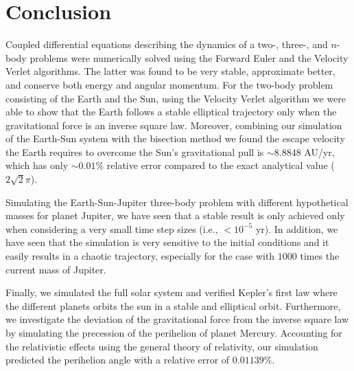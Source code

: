 \documentclass[a4paper]{article}
\begin{document}
\section{Conclusion}
Coupled differential equations describing the dynamics of a two-, three-, and $n$-body problems were numerically solved using the Forward Euler and the Velocity Verlet algorithms.
The latter was found to be very stable, approximate better, and conserve both energy and angular momentum. For the two-body problem consisting of the Earth and the Sun, using the Velocity Verlet algorithm we were able to show that the Earth follows a stable elliptical trajectory only when the gravitational force is an inverse square law. Moreover, combining our simulation of the Earth-Sun system with the bisection method we found the escape velocity the Earth requires to overcome the Sun's gravitational pull is $\sim 8.8848$ AU/yr, which has only $\sim 0.01\%$ relative error compared to the exact analytical value ($2\sqrt{2}\pi$).

Simulating the Earth-Sun-Jupiter three-body problem with different hypothetical masses for planet Jupiter, we have seen that a stable result is only achieved only when considering a very small time step sizes (i.e., $< 10^{-5}$ yr). In addition, we have seen that the simulation is very sensitive to the initial conditions and it easily results in a chaotic trajectory, especially for the case with $1000$ times the current mass of Jupiter.

Finally, we simulated the full solar system and verified Kepler's first law where the different planets orbits the sun in a stable and elliptical orbit. Furthermore, we investigate the deviation of the gravitational force from the inverse square law by simulating the precession of the perihelion of planet Mercury. Accounting for the relativistic effects using the general theory of relativity, our simulation predicted the perihelion angle with a relative error of $0.01139\%$.

%
%


\end{document}
